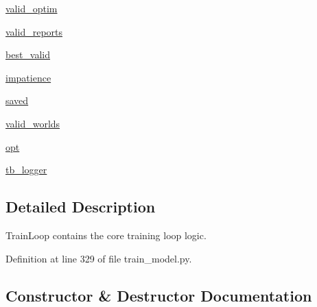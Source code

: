 \begin{DoxyCompactItemize}
\hyperlink{classparlai_1_1scripts_1_1train__model_1_1TrainLoop_abe8e421aafd3a42103c794f3e3a1bcc6}{valid\+\_\+optim}
\item 
\hyperlink{classparlai_1_1scripts_1_1train__model_1_1TrainLoop_abceaa403716b5def408e2fedca6c651d}{valid\+\_\+reports}
\item 
\hyperlink{classparlai_1_1scripts_1_1train__model_1_1TrainLoop_a48a44b00d7b814ff20d0599803e92411}{best\+\_\+valid}
\item 
\hyperlink{classparlai_1_1scripts_1_1train__model_1_1TrainLoop_aeb16930507dc585a10096e2b235e2745}{impatience}
\item 
\hyperlink{classparlai_1_1scripts_1_1train__model_1_1TrainLoop_a22cd642f6665fabdc49cdd294e257643}{saved}
\item 
\hyperlink{classparlai_1_1scripts_1_1train__model_1_1TrainLoop_a45643d393057a2a47e8a6e74acdc7515}{valid\+\_\+worlds}
\item 
\hyperlink{classparlai_1_1scripts_1_1train__model_1_1TrainLoop_a3f9cd4c0c08f457b3ecfd1e494ccf58c}{opt}
\item 
\hyperlink{classparlai_1_1scripts_1_1train__model_1_1TrainLoop_af6636a1279a3fb33f57ba1af500d049b}{tb\+\_\+logger}
\end{DoxyCompactItemize}


\subsection{Detailed Description}
\begin{DoxyVerb}TrainLoop contains the core training loop logic.
\end{DoxyVerb}
 

Definition at line 329 of file train\+\_\+model.\+py.



\subsection{Constructor \& Destructor Documentation}
\mbox{\label{classparlai_1_1scripts_1_1train__model_1_1TrainLoop_a87a9194a461efe30e8b4de6cd4036699}} 
